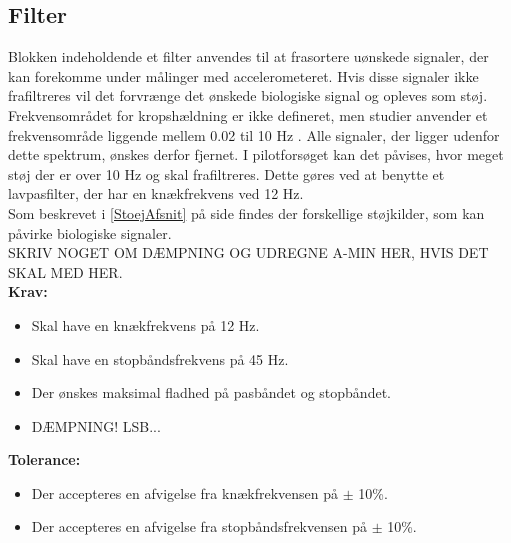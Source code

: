 \subsection{Filter}\label{FilterAfs}
Blokken indeholdende et filter anvendes til at frasortere uønskede signaler, der kan forekomme under målinger med accelerometeret. Hvis disse signaler ikke frafiltreres vil det forvrænge det ønskede biologiske signal og opleves som støj. Frekvensområdet for kropshældning er ikke defineret, men studier anvender et frekvensområde liggende mellem 0.02 til 10 Hz \cite{Martinez-Mendez2011}. Alle signaler, der ligger udenfor dette spektrum, ønskes derfor fjernet. I pilotforsøget kan det påvises, hvor meget støj der er over 10 Hz og skal frafiltreres. Dette gøres ved at benytte et lavpasfilter, der har en knækfrekvens ved 12 Hz. \\
Som beskrevet i \ref{StoejAfsnit} på side \pageref{StoejAfsnit} findes der forskellige støjkilder, som kan påvirke biologiske signaler. \\
SKRIV NOGET OM DÆMPNING OG UDREGNE A-MIN HER, HVIS DET SKAL MED HER.\\
\textbf{Krav:}
\begin{itemize}
\item Skal have en knækfrekvens på 12 Hz.
\item Skal have en stopbåndsfrekvens på 45 Hz.
\item Der ønskes maksimal fladhed på pasbåndet og stopbåndet.
\item DÆMPNING! LSB...
\end{itemize}
\textbf{Tolerance:}
\begin{itemize}
\item Der accepteres en afvigelse fra knækfrekvensen på $\pm$ 10\%.
\item Der accepteres en afvigelse fra stopbåndsfrekvensen på $\pm$ 10\%.
\end{itemize}

